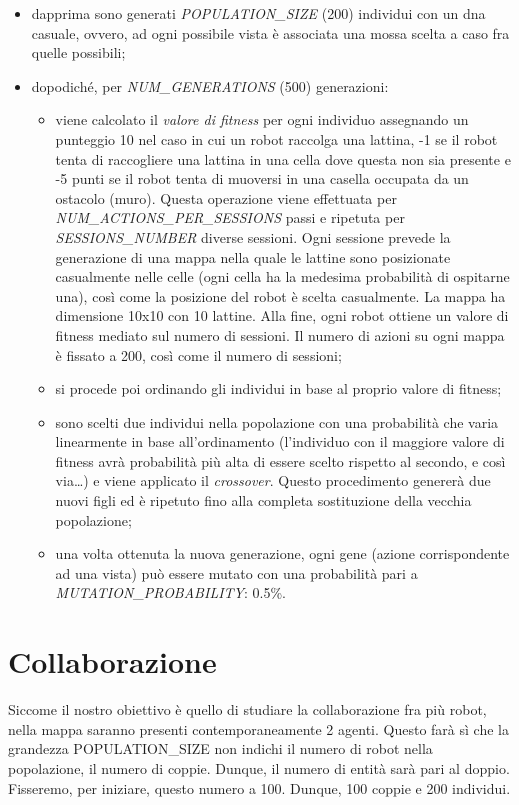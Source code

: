 \begin{itemize}
	\item dapprima sono generati \textit{POPULATION\_SIZE} (200) individui con
	un dna casuale, ovvero, ad ogni possibile vista è associata una mossa scelta
	a caso fra quelle possibili;
	\item dopodiché, per \textit{NUM\_GENERATIONS} (500) generazioni:
	\begin{itemize}
		\item viene calcolato il \textit{valore di fitness} per ogni individuo
		assegnando un punteggio 10 nel caso in cui un robot raccolga una
		lattina, -1 se il robot tenta di raccogliere una lattina in una cella
		dove questa non sia presente e -5 punti se il robot tenta di muoversi in
		una casella occupata da un ostacolo (muro). Questa operazione viene
		effettuata per \textit{NUM\_ACTIONS\_PER\_SESSIONS} passi e ripetuta per
		\textit{SESSIONS\_NUMBER} diverse sessioni. Ogni sessione prevede la
		generazione di una mappa nella quale le lattine sono posizionate
		casualmente nelle celle (ogni cella ha la medesima probabilità di
		ospitarne una), così come la posizione del robot è scelta casualmente.
		La mappa ha dimensione 10x10 con 10 lattine. Alla fine, ogni robot
		ottiene un valore di fitness mediato sul numero di sessioni. Il numero
		di azioni su ogni mappa è fissato a 200, così come il numero di
		sessioni;
		\item si procede poi ordinando gli individui in base al proprio valore
		di fitness;
		\item sono scelti due individui nella popolazione con una probabilità
		che varia linearmente in base all'ordinamento (l'individuo con il
		maggiore valore di fitness avrà probabilità più alta di essere scelto
		rispetto al secondo, e così via\dots) e viene applicato il
		\textit{crossover}. Questo procedimento genererà due nuovi figli ed è
		ripetuto fino alla completa sostituzione della vecchia popolazione;
		\item una volta ottenuta la nuova generazione, ogni gene (azione
		corrispondente ad una vista) può essere mutato con una probabilità pari
		a \textit{MUTATION\_PROBABILITY}: 0.5\%.
	\end{itemize}
\end{itemize}

\section{Collaborazione}
Siccome il nostro obiettivo è quello di studiare la collaborazione fra più
robot, nella mappa saranno presenti contemporaneamente 2 agenti. Questo farà sì
che la grandezza POPULATION\_SIZE non indichi il numero di robot nella
popolazione, il numero di coppie. Dunque, il numero di entità sarà pari al
doppio. Fisseremo, per iniziare, questo numero a 100. Dunque, 100 coppie e 200
individui.

